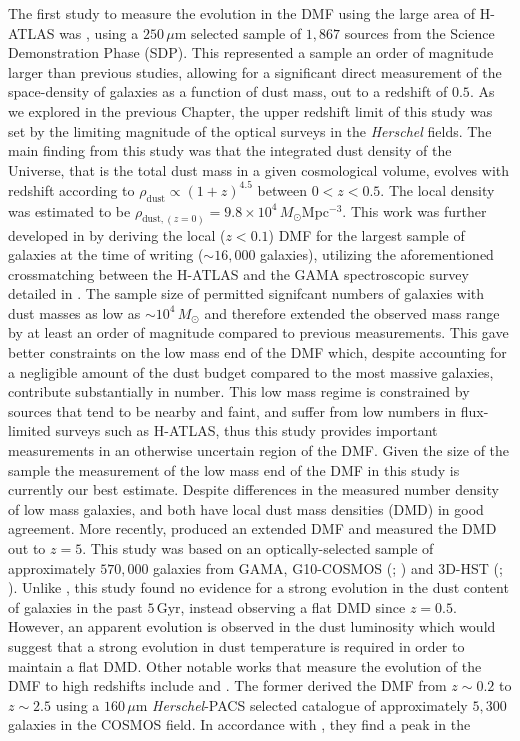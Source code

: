The first study to measure the evolution in the DMF using the large area of H-ATLAS was \citealt{Dunne_2011}, using a $250\,\mu$m selected sample of $1,867$ sources from the Science Demonstration Phase (SDP). This represented a sample an order of magnitude larger than previous studies, allowing for a significant direct measurement of the space-density of galaxies as a function of dust mass, out to a redshift of $0.5$. As we explored in the previous Chapter, the upper redshift limit of this study was set by the limiting magnitude of the optical surveys in the \textit{Herschel} fields. The main finding from this study was that the integrated dust density of the Universe, that is the total dust mass in a given cosmological volume, evolves with redshift according to $\rho_{\textrm{dust}} \propto (1+z)^{4.5}$ between $0 < z < 0.5$. The local density was estimated to be $\rho_{\textrm{dust}, (z=0)} = 9.8\times10^4$\,$M_\odot$Mpc$^{-3}$. This work was further developed in \citealt{Beeston_2018} by deriving the local ($z < 0.1$) DMF for the largest sample of galaxies at the time of writing ($\sim 16,000$ galaxies), utilizing the aforementioned crossmatching between the H-ATLAS and the GAMA spectroscopic survey detailed in \citealt{Bourne_2016}. The sample size of \citealt{Beeston_2018} permitted signifcant numbers of galaxies with dust masses as low as $\sim 10^4\,M_\odot$ and therefore extended the observed mass range by at least an order of magnitude compared to previous measurements. This gave better constraints on the low mass end of the DMF which, despite accounting for a negligible amount of the dust budget compared to the most massive galaxies, contribute substantially in number. This low mass regime is constrained by sources that tend to be nearby and faint, and suffer from low numbers in flux-limited surveys such as H-ATLAS, thus this study provides important measurements in an otherwise uncertain region of the DMF. Given the size of the \citealt{Beeston_2018} sample the measurement of the low mass end of the DMF in this study is currently our best estimate. Despite differences in the measured number density of low mass galaxies, \citealt{Dunne_2011} and \citealt{Beeston_2018} both have local dust mass densities (DMD) in good agreement. More recently, \citealt{Driver_2018} produced an extended DMF and measured the DMD out to $z = 5$. This study was based on an optically-selected sample of approximately $570,000$ galaxies from GAMA, G10-COSMOS (\citealt{Davies_2015}; \citealt{Andrews_2017}) and 3D-HST (\citealt{Brammer_2012}; \citealt{Momcheva_2016}). Unlike \citealt{Dunne_2011}, this study found no evidence for a strong evolution in the dust content of galaxies in the past $5\,$Gyr, instead observing a flat DMD since $z = 0.5$. However, an apparent evolution is observed in the dust luminosity which would suggest that a strong evolution in dust temperature is required in order to maintain a flat DMD. Other notable works that measure the evolution of the DMF to high redshifts include \citealt{Pozzi_2020} and \citealt{Dudzeviciute_2021}. The former derived the DMF from $z \sim 0.2$ to $z \sim 2.5$ using a $160\,\mu$m \textit{Herschel}-PACS selected catalogue of approximately $5,300$ galaxies in the COSMOS field. In accordance with \citealt{Driver_2018}, they find a peak in the 
